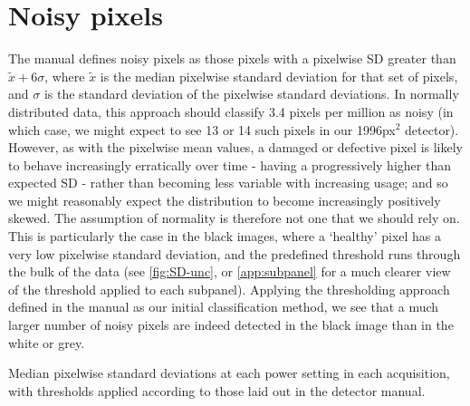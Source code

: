 \documentclass[10pt,fleqn]{article}
\begin{document}

\section*{Noisy pixels}

The manual defines noisy pixels as those pixels with a pixelwise SD greater than $\tilde{x} + 6\sigma$, where $\tilde{x}$ is the median pixelwise standard deviation for that set of pixels, and $\sigma$ is the standard deviation of the pixelwise standard deviations. In normally distributed data, this approach should classify 3.4 pixels per million as noisy (in which case, we might expect to see 13 or 14 such pixels in our 1996px$^2$ detector). However, as with the pixelwise mean values, a damaged or defective pixel is likely to behave increasingly erratically over time - having a progressively higher than expected SD - rather than becoming less variable with increasing usage; and so we might reasonably expect the distribution to become increasingly positively skewed. The assumption of normality is therefore not one that we should rely on. This is particularly the case in the black images, where a `healthy' pixel has a very low pixelwise standard deviation, and the predefined threshold runs through the bulk of the data (see \autoref{fig:SD-unc}, or \autoref{app:subpanel} for a much clearer view of the threshold applied to each subpanel). Applying the thresholding approach defined in the manual as our initial classification method, we see that a much larger number of noisy pixels are indeed detected in the black image than in the white or grey.

\begin{table}[!ht] %
\begin{footnotesize}
\caption{Median pixelwise standard deviations at each power setting in each acquisition, with thresholds applied according to those laid out in the detector manual.}

\end{footnotesize}
\end{table}
\end{document}
